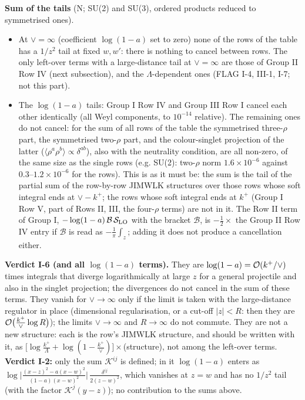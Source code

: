 \documentclass[9pt]{article}
\numberwithin{equation}{section}
\begin{document}
\noindent\textbf{Sum of the tails} (N; SU(2) and SU(3), ordered products reduced to symmetrised ones).
\begin{itemize}
\item At $\vee=\infty$ (coefficient $\log(1-a)$ set to zero) none of the rows of the table has a $1/z^{2}$ tail at fixed $w,w'$: there is nothing to cancel between rows. The only left-over terms with a large-distance tail at $\vee=\infty$ are those of Group II Row IV (next subsection), and the $\Lambda$-dependent ones (FLAG I-4, III-1, I-7; not this part).
\item The $\log(1-a)$ tails: Group I Row IV and Group III Row I cancel each other identically (all Weyl components, to $10^{-14}$ relative). The remaining ones do not cancel: for the sum of all rows of the table the symmetrised three-$\rho$ part, the symmetrised two-$\rho$ part, and the colour-singlet projection of the latter ($\langle\rho^{a}\rho^{b}\rangle\propto\delta^{ab}$), also with the neutrality condition, are all non-zero, of the same size as the single rows (e.g. SU(2): two-$\rho$ norm $1.6\times10^{-6}$ against $0.3$--$1.2\times10^{-6}$ for the rows). This is as it must be: the sum is the tail of the partial sum of the row-by-row JIMWLK structures over those rows whose soft integral ends at $\vee-k^{+}$; the rows whose soft integral ends at $k^{+}$ (Group I Row V, part of Rows II, III, the four-$\rho$ terms) are not in it. The Row II term of Group I, $-\log(1-a)\,\mathcal B\,\mathcal S_{\rm LO}$ with the bracket $\mathcal B$, is $-\frac12\times$ the Group II Row IV entry if $\mathcal B$ is read as $-\frac1\pi\int_{z}$; adding it does not produce a cancellation either.
\end{itemize}
\noindent\textbf{Verdict I-6 (and all $\log(1-a)$ terms).} They are $\log(1-a)={\cal O}(k^{+}/\vee)$ times integrals that diverge logarithmically at large $z$ for a general projectile and also in the singlet projection; the divergences do not cancel in the sum of these terms. They vanish for $\vee\to\infty$ only if the limit is taken with the large-distance regulator in place (dimensional regularisation, or a cut-off $|z|<R$: then they are ${\cal O}\big(\frac{k^{+}}{\vee}\log R\big)$); the limits $\vee\to\infty$ and $R\to\infty$ do not commute. They are not a new structure: each is the row's JIMWLK structure, and should be written with it, as $\big[\log\frac{k^{+}}{\Lambda}+\log(1-\frac{k^{+}}{\vee})\big]\times$(structure), not among the left-over terms. \textbf{Verdict I-2:} only the sum $\mathcal K^{ij}$ is defined; in it $\log(1-a)$ enters as $\log\big|\frac{(x-z)^{2}-a(x-w)^{2}}{(1-a)(x-w)^{2}}\big|\,\frac{\delta^{ij}}{2(z-w)^{2}}$, which vanishes at $z=w$ and has no $1/z^{2}$ tail (with the factor $\mathcal K^{j}(y-z)$); no contribution to the sums above.
\end{document}
